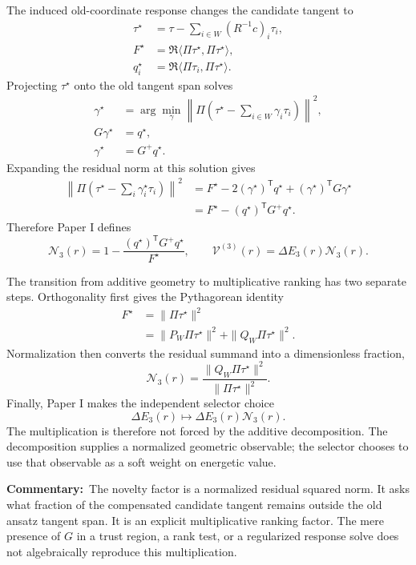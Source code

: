 \documentclass[10pt,twocolumn]{article}
\newcommand{\commentary}[1]{\par\noindent\textbf{Commentary:}\ #1\par}
\begin{document}
The induced old-coordinate response changes the candidate tangent to
\begin{align}
\tau^\star
&=\tau-\sum_{i\in W}(R^{-1}c)_i\tau_i,\label{eq:audit-taustar}\\
F^\star
&=\Re\langle\Pi\tau^\star,\Pi\tau^\star\rangle,\\
q_i^\star
&=\Re\langle\Pi\tau_i,\Pi\tau^\star\rangle.
\end{align}
Projecting \(\tau^\star\) onto the old tangent span solves
\begin{align*}
\gamma^\star
&=\arg\min_\gamma
\left\|\Pi\left(\tau^\star-
\sum_{i\in W}\gamma_i\tau_i\right)\right\|^2,\\
G\gamma^\star&=q^\star,\\
\gamma^\star&=G^+q^\star.
\end{align*}
Expanding the residual norm at this solution gives
\begin{align*}
\left\|\Pi\left(\tau^\star-
\sum_i\gamma_i^\star\tau_i\right)\right\|^2
&=F^\star-2(\gamma^\star)^{\mathsf T}q^\star
+(\gamma^\star)^{\mathsf T}G\gamma^\star\\
&=F^\star-(q^\star)^{\mathsf T}G^+q^\star.
\end{align*}
Therefore Paper I defines
\begin{equation}
\boxed{
\mathcal N_3(r)
=1-\frac{(q^\star)^{\mathsf T}G^+q^\star}{F^\star},
\qquad
\mathcal V^{(3)}(r)
=\Delta E_3(r)\mathcal N_3(r).}
\label{eq:audit-phase3-score}
\end{equation}

The transition from additive geometry to multiplicative ranking has two
separate steps. Orthogonality first gives the Pythagorean identity
\begin{align*}
F^\star
&=\|\Pi\tau^\star\|^2\\
&=\|P_W\Pi\tau^\star\|^2
+\|Q_W\Pi\tau^\star\|^2.
\end{align*}
Normalization then converts the residual summand into a dimensionless fraction,
\[
\mathcal N_3(r)
=\frac{\|Q_W\Pi\tau^\star\|^2}{\|\Pi\tau^\star\|^2}.
\]
Finally, Paper I makes the independent selector choice
\[
\Delta E_3(r)
\longmapsto
\Delta E_3(r)\mathcal N_3(r).
\]
The multiplication is therefore not forced by the additive decomposition. The
decomposition supplies a normalized geometric observable; the selector chooses
to use that observable as a soft weight on energetic value.

\commentary{The novelty factor is a normalized residual squared norm. It asks
what fraction of the compensated candidate tangent remains outside the old
ansatz tangent span. It is an explicit multiplicative ranking factor. The mere
presence of \(G\) in a trust region, a rank test, or a regularized response
solve does not algebraically reproduce this multiplication.}
\end{document}
